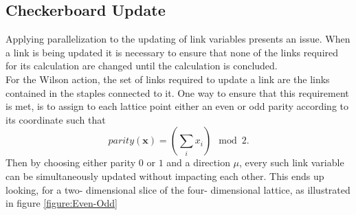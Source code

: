 \documentclass[a4paper,10pt]{article}
\begin{document}
\subsection{Checkerboard Update}\label{sec:Checkerboard_Update}
Applying parallelization to the updating of link variables presents an issue. When a link is being updated it is necessary to ensure that none of the links required for its calculation are changed until the calculation is concluded.\\For the Wilson action, the set of links required to update a link are the links contained in the staples connected to it. One way to ensure that this requirement is met, is to assign to each lattice point either an even or odd parity according to its coordinate
such that 
\begin{equation}
parity(\mathbf{x}) = \left( \sum\limits_i x_i \right) \mod 2.
\end{equation}
Then by choosing either parity $0$ or $1$ and a direction $\mu$, every such link variable can be simultaneously updated without impacting each other. This ends up looking, for a two- dimensional slice of the four- dimensional lattice, as illustrated in figure \ref{figure:Even-Odd}
\end{document}
